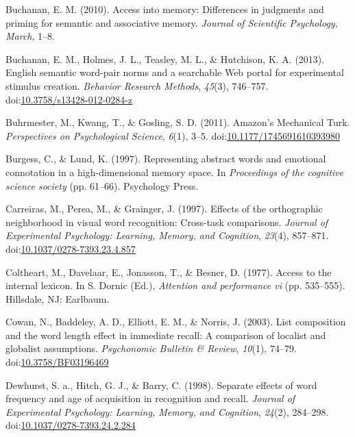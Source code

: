\documentclass[english,man]{apa6}
\theoremstyle{definition}
\theoremstyle{definition}
\theoremstyle{definition}
\theoremstyle{remark}
\begin{document}
\hypertarget{ref-Buchanan2010}{}
Buchanan, E. M. (2010). Access into memory: Differences in judgments and
priming for semantic and associative memory. \emph{Journal of Scientific
Psychology}, \emph{March}, 1--8.

\hypertarget{ref-Buchanan2013}{}
Buchanan, E. M., Holmes, J. L., Teasley, M. L., \& Hutchison, K. A.
(2013). English semantic word-pair norms and a searchable Web portal for
experimental stimulus creation. \emph{Behavior Research Methods},
\emph{45}(3), 746--757.
doi:\href{https://doi.org/10.3758/s13428-012-0284-z}{10.3758/s13428-012-0284-z}

\hypertarget{ref-Buhrmester2011}{}
Buhrmester, M., Kwang, T., \& Gosling, S. D. (2011). Amazon's Mechanical
Turk. \emph{Perspectives on Psychological Science}, \emph{6}(1), 3--5.
doi:\href{https://doi.org/10.1177/1745691610393980}{10.1177/1745691610393980}

\hypertarget{ref-Burgess1997}{}
Burgess, C., \& Lund, K. (1997). Representing abstract words and
emotional connotation in a high-dimensional memory space. In
\emph{Proceedings of the cognitive science society} (pp. 61--66).
Psychology Press.

\hypertarget{ref-Carreiras1997}{}
Carreiras, M., Perea, M., \& Grainger, J. (1997). Effects of the
orthographic neighborhood in visual word recognition: Cross-task
comparisons. \emph{Journal of Experimental Psychology: Learning, Memory,
and Cognition}, \emph{23}(4), 857--871.
doi:\href{https://doi.org/10.1037/0278-7393.23.4.857}{10.1037/0278-7393.23.4.857}

\hypertarget{ref-Coltheart1977}{}
Coltheart, M., Davelaar, E., Jonasson, T., \& Besner, D. (1977). Access
to the internal lexicon. In S. Dornic (Ed.), \emph{Attention and
performance vi} (pp. 535--555). Hillsdale, NJ: Earlbaum.

\hypertarget{ref-Cowan2003}{}
Cowan, N., Baddeley, A. D., Elliott, E. M., \& Norris, J. (2003). List
composition and the word length effect in immediate recall: A comparison
of localist and globalist assumptions. \emph{Psychonomic Bulletin \&
Review}, \emph{10}(1), 74--79.
doi:\href{https://doi.org/10.3758/BF03196469}{10.3758/BF03196469}

\hypertarget{ref-Dewhurst1998}{}
Dewhurst, S. a., Hitch, G. J., \& Barry, C. (1998). Separate effects of
word frequency and age of acquisition in recognition and recall.
\emph{Journal of Experimental Psychology: Learning, Memory, and
Cognition}, \emph{24}(2), 284--298.
doi:\href{https://doi.org/10.1037/0278-7393.24.2.284}{10.1037/0278-7393.24.2.284}
\end{document}
